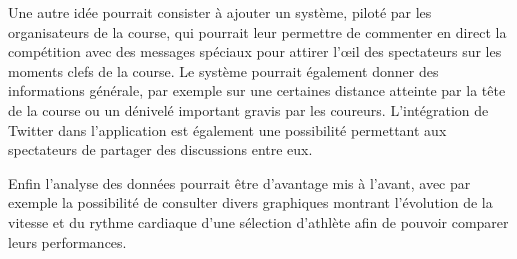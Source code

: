Une autre idée pourrait consister à ajouter un système, piloté par les organisateurs de la course, qui pourrait leur permettre de commenter en direct la compétition avec des messages spéciaux pour attirer l'œil des spectateurs sur les moments clefs de la course. Le système pourrait également donner des informations générale, par exemple sur une certaines distance atteinte par la tête de la course ou un dénivelé important gravis par les coureurs. L'intégration de Twitter dans l'application est également une possibilité permettant aux spectateurs de partager des discussions entre eux.

Enfin l'analyse des données pourrait être d'avantage mis à l'avant, avec par exemple la possibilité de consulter divers graphiques montrant l'évolution de la vitesse et du rythme cardiaque d'une sélection d'athlète afin de pouvoir comparer leurs performances.